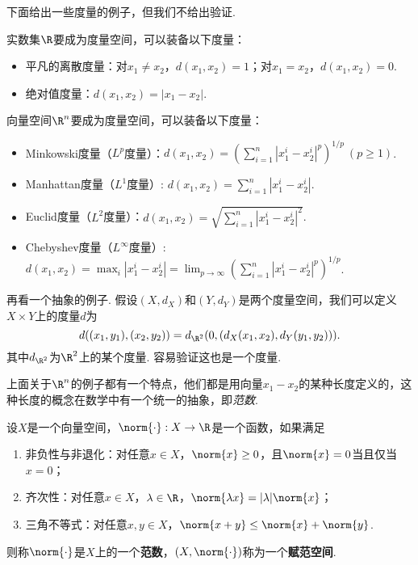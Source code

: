 下面给出一些度量的例子，但我们不给出验证. 
\begin{example}\label{ex:metric}
    实数集$\R$要成为度量空间，可以装备以下度量：
    \begin{itemize}
            \item 平凡的离散度量：对$x_1\neq x_2$，$d(x_1,x_2)=1$；对$x_1=x_2$，$d(x_1,x_2)=0$. 
            \item 绝对值度量：$d(x_1,x_2)=|x_1-x_2|$. 
        \end{itemize}

        向量空间$\R^n$要成为度量空间，可以装备以下度量：
        \begin{itemize}
            \item Minkowski度量（$L^p$度量）：$d(x_1,x_2)=(\sum_{i=1}^n|x_1^i-x_2^i|^p)^{1/p}\ (p\ge 1)$. 
            \item Manhattan度量（$L^1$度量）: $d(x_1,x_2)=\sum_{i=1}^n|x_1^i-x_2^i|$. 
            \item Euclid度量（$L^2$度量）：$d(x_1,x_2)=\sqrt{\sum_{i=1}^n|x_1^i-x_2^i|^2}$. 
            \item Chebyshev度量（$L^\infty$度量）: $d(x_1,x_2)=\max_i|x_1^i-x_2^i|=\lim_{p\to\infty}(\sum_{i=1}^n|x_1^i-x_2^i|^p)^{1/p}$. 
        \end{itemize}

    再看一个抽象的例子. 假设$(X,d_X)$和$(Y,d_Y)$是两个度量空间，我们可以定义$X\times Y$上的度量$d$为
    \[d((x_1,y_1),(x_2,y_2))=d_{\R^2}(0,(d_X(x_1,x_2),d_Y(y_1,y_2))).\]
    其中$d_{\R^2}$为$\R^2$上的某个度量. 容易验证这也是一个度量. 
\end{example}

上面关于$\R^n$的例子都有一个特点，他们都是用向量$x_1-x_2$的某种长度定义的，这种长度的概念在数学中有一个统一的抽象，即\emph{范数}. 

\begin{definition}[范数，赋范空间]
设$X$是一个向量空间，$\norm{\cdot}:X\to\R$是一个函数，如果满足
\begin{enumerate}
    \item 非负性与非退化：对任意$x\in X$，$\norm{x}\geq 0$，且$\norm{x}=0$当且仅当$x=0$；
    \item 齐次性：对任意$x\in X$，$\lambda\in\R$，$\norm{\lambda x}=|\lambda|\norm{x}$；
    \item 三角不等式：对任意$x,y\in X$，$\norm{x+y}\leq \norm{x}+\norm{y}$. 
\end{enumerate}
则称$\norm{\cdot}$是$X$上的一个\textbf{范数}，$(X,\norm{\cdot})$称为一个\textbf{赋范空间}. 
\end{definition}

